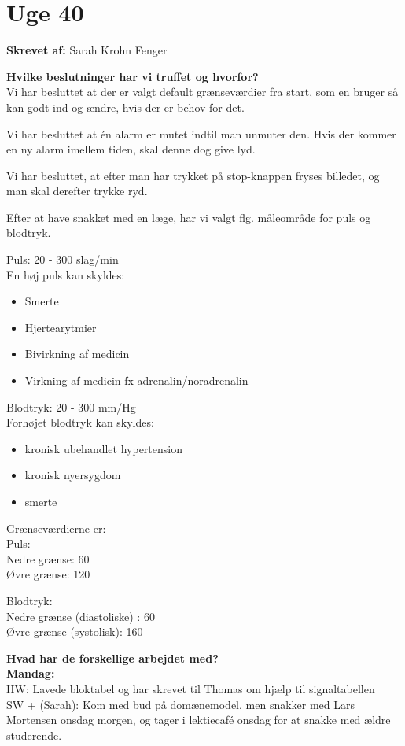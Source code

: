 \section{Uge 40}

\textbf{Skrevet af:} 
Sarah Krohn Fenger

\textbf{Hvilke beslutninger har vi truffet og hvorfor? } \\
Vi har besluttet at der er valgt default grænseværdier fra start, som en bruger så kan godt ind og ændre, hvis der er behov for det. 

Vi har besluttet at én alarm er mutet indtil man unmuter den. Hvis der kommer en ny alarm imellem tiden, skal denne dog give lyd. 

Vi har besluttet, at efter man har trykket på stop-knappen fryses billedet, og man skal derefter trykke ryd. 


Efter at have snakket med en læge, har vi valgt flg. måleområde for puls og blodtryk. 

Puls: 20 - 300 slag/min \\
En høj puls kan skyldes:
\begin{itemize}
	\item Smerte
	\item Hjertearytmier
	\item Bivirkning af medicin
	\item Virkning af medicin fx adrenalin/noradrenalin
\end{itemize}

Blodtryk: 20 - 300 mm/Hg \\
Forhøjet blodtryk kan skyldes:
\begin{itemize}
	\item kronisk ubehandlet hypertension
	\item kronisk nyersygdom
	\item smerte
\end{itemize}

Grænseværdierne er: \\
Puls: \\
Nedre grænse: 60 \\
Øvre grænse: 120

Blodtryk: \\
Nedre grænse (diastoliske) : 60 \\
Øvre grænse (systolisk): 160


\textbf{Hvad har de forskellige arbejdet med? } \\
\textbf{Mandag:} \\
HW: Lavede bloktabel og har skrevet til Thomas om hjælp til signaltabellen \\
SW + (Sarah): Kom med bud på domænemodel, men snakker med Lars Mortensen onsdag morgen, og tager i lektiecafé onsdag for at snakke med ældre studerende. 

